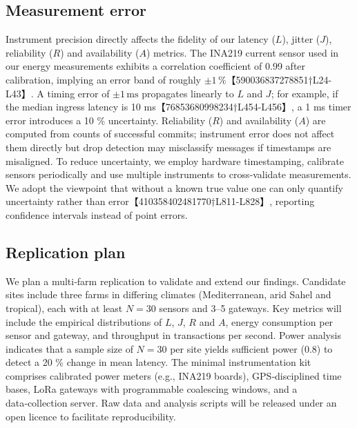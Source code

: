 \subsection{Measurement error}
Instrument precision directly affects the fidelity of our latency ($L$), jitter ($J$), reliability ($R$) and availability ($A$) metrics.  The INA219 current sensor used in our energy measurements exhibits a correlation coefficient of 0.99 after calibration, implying an error band of roughly \(\pm1\,\%\)【590036837278851†L24-L43】.  A timing error of \(\pm1\,\text{ms}\) propagates linearly to $L$ and $J$; for example, if the median ingress latency is 10 ms【76853680998234†L454-L456】, a 1 ms timer error introduces a 10 \% uncertainty.  Reliability ($R$) and availability ($A$) are computed from counts of successful commits; instrument error does not affect them directly but drop detection may misclassify messages if timestamps are misaligned.  To reduce uncertainty, we employ hardware timestamping, calibrate sensors periodically and use multiple instruments to cross‑validate measurements.  We adopt the viewpoint that without a known true value one can only quantify uncertainty rather than error【410358402481770†L811-L828】, reporting confidence intervals instead of point errors.

\subsection{Replication plan}
We plan a multi‑farm replication to validate and extend our findings.  Candidate sites include three farms in differing climates (Mediterranean, arid Sahel and tropical), each with at least \(N=30\) sensors and 3--5 gateways.  Key metrics will include the empirical distributions of $L$, $J$, $R$ and $A$, energy consumption per sensor and gateway, and throughput in transactions per second.  Power analysis indicates that a sample size of \(N=30\) per site yields sufficient power (0.8) to detect a 20 \% change in mean latency.  The minimal instrumentation kit comprises calibrated power meters (e.g., INA219 boards), GPS‑disciplined time bases, LoRa gateways with programmable coalescing windows, and a data‑collection server.  Raw data and analysis scripts will be released under an open licence to facilitate reproducibility.
